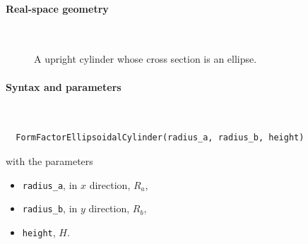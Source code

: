\paragraph{Real-space geometry}\strut\\

\begin{figure}[H]
\hfill
{}
\hfill
{}
\hfill
{}
\hfill
\caption{A upright cylinder whose cross section is an ellipse.}
\end{figure}

\paragraph{Syntax and parameters}\strut\\[-2ex plus .2ex minus .2ex]
\begin{lstlisting}
  FormFactorEllipsoidalCylinder(radius_a, radius_b, height)
\end{lstlisting}
with the parameters
\begin{itemize}
\item \texttt{radius\_a}, in $x$ direction, $R_a$,
\item \texttt{radius\_b}, in $y$ direction, $R_b$,
\item \texttt{height}, $H$.
\end{itemize}

